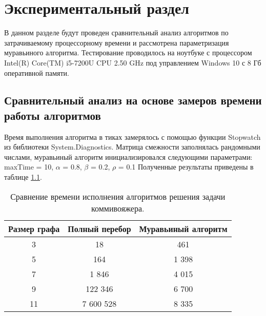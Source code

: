 \chapter{Экспериментальный раздел}
\label{cha:research}
    В данном разделе будут проведен  
    сравнительный анализ алгоритмов по затрачиваемому процессорному 
    времени и рассмотрена параметризация муравьиного алгоритма.
    Тестирование проводилось на ноутбуке с процессором
    Intel(R) Core(TM) i5-7200U CPU 2.50 GHz \cite{processor-i5-7200u}
    под управлением Windows 10 с 8 Гб оперативной памяти.

    \section{Сравнительный анализ на основе замеров времени работы алгоритмов}
        Время выполнения алгоритма в тиках замерялось с помощью функции Stopwatch \cite{csharp-stopwatch}
        из библиотеки System.Diagnostics.
        Матрица смежности заполнялась рандомными числами,
        муравьиный алгоритм инициализировался следующими параметрами:
        maxTime = 10, $\alpha$ = 0.8, $\beta$ = 0.2, $\rho$ = 0.1
        Полученные результаты приведены в таблице \ref{table:test:time}.
        
        \begin{table}[h!]
            \begin{center}
                \begin{tabular}{|c|c|c|}
                    \hline
                    Размер графа & Полный перебор & Муравьиный алгоритм \\ \hline
                    3            & 18             & 461             \\ \hline
                    5            & 164            & 1 398           \\ \hline
                    7            & 1 846          & 4 015           \\ \hline
                    9            & 122 346        & 6 700           \\ \hline
                    11           & 7 600 528      & 8 335           \\ 
                    \hline
                \end{tabular}
            \end{center}
            \caption{Сравнение времени исполнения алгоритмов решения задачи коммивояжера.}
            \label{table:test:time}
        \end{table}      
        
